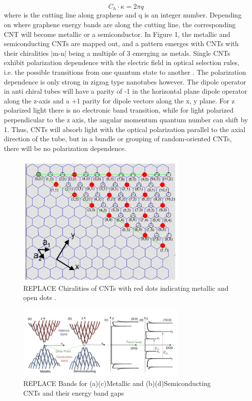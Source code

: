 \begin{equation}
	C_h\cdot\kappa = 2\pi q
\end{equation}
where  is the cutting line along graphene and q is an integer number. 
Depending on where graphene energy bands are along the cutting line, the corresponding CNT will become metallic or a semiconductor. In Figure 1, the metallic and semiconducting CNTs are mapped out, and a pattern emerges with CNTs with their chiralities |m-n| being a multiple of 3 emerging as metals.
Single CNTs exhibit polarization dependence with the electric field in optical selection rules, i.e. the possible transitions from one quantum state to another \cite{thomsen}. The polarization dependence is only strong in zigzag type nanotubes however. The dipole operator in anti chiral tubes will have a parity of -1 in the horizontal plane dipole operator along the z-axis and a +1 parity for dipole vectors along the x, y plane. For z polarized light there is no electronic band transition, while for light polarized perpendicular to the z axis, the angular momentum quantum number can shift by 1. Thus, CNTs will absorb light with the optical polarization parallel to the axial direction of the tube, but in a bundle or grouping of random-oriented CNTs, there will be no polarization dependence.

\begin{figure}[h]
	\centering
	\includegraphics[width=0.75\textwidth]{./Figures/CNTs/chiral.png}
	\caption{REPLACE Chiralities of CNTs with red dots indicating metallic and open dots  \cite{dresselhaus}. }
	\label{fig:chiralities}
\end{figure}
\clearpage

\begin{figure}[h]
	\centering
	\includegraphics[width=0.75\textwidth]{./Figures/CNTs/DOS.png}
	\caption { REPLACE Bands for (a)(c)Metallic and (b)(d)Semiconducting CNTs and their energy band gaps \cite{yamashita}}
\label{fig:cnt dos}
\end{figure}
\clearpage

